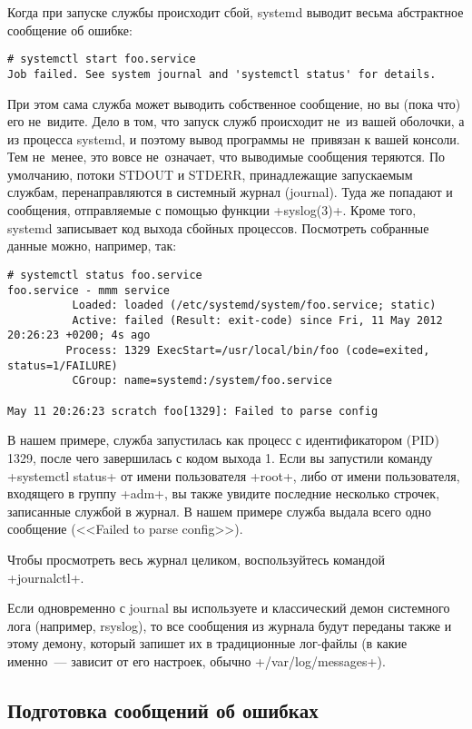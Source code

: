 \documentclass[10pt,oneside,a4paper]{article}
\begin{document}
Когда при запуске службы происходит сбой, systemd выводит весьма абстрактное
сообщение об ошибке:
\begin{Verbatim}
# systemctl start foo.service
Job failed. See system journal and 'systemctl status' for details.
\end{Verbatim}

При этом сама служба может выводить собственное сообщение, но вы (пока что) его
не~видите. Дело в том, что запуск служб происходит не~из вашей оболочки, а из
процесса systemd, и поэтому вывод программы не~привязан к вашей консоли. Тем
не~менее, это вовсе не~означает, что выводимые сообщения теряются. По умолчанию,
потоки STDOUT и STDERR, принадлежащие запускаемым службам, перенаправляются в
системный журнал (journal). Туда же попадают и сообщения, отправляемые с помощью
функции +syslog(3)+. Кроме того, systemd записывает код выхода сбойных
процессов. Посмотреть собранные данные можно, например, так:
\begin{Verbatim}
# systemctl status foo.service
foo.service - mmm service
          Loaded: loaded (/etc/systemd/system/foo.service; static)
          Active: failed (Result: exit-code) since Fri, 11 May 2012 20:26:23 +0200; 4s ago
         Process: 1329 ExecStart=/usr/local/bin/foo (code=exited, status=1/FAILURE)
          CGroup: name=systemd:/system/foo.service

May 11 20:26:23 scratch foo[1329]: Failed to parse config	
\end{Verbatim}

В нашем примере, служба запустилась как процесс с идентификатором (PID) 1329,
после чего завершилась с кодом выхода 1. Если вы запустили команду
+systemctl status+ от имени пользователя +root+, либо от имени пользователя,
входящего в группу +adm+, вы также увидите последние несколько строчек,
записанные службой в журнал. В нашем примере служба выдала всего одно сообщение
(<<Failed to parse config>>).

Чтобы просмотреть весь журнал целиком, воспользуйтесь командой +journalctl+.

Если одновременно с journal вы используете и классический демон системного лога
(например, rsyslog), то все сообщения из журнала будут переданы также и этому
демону, который запишет их в традиционные лог-файлы (в какие именно~--- зависит
от его настроек, обычно +/var/log/messages+).

\subsection{Подготовка сообщений об ошибках}
\end{document}
